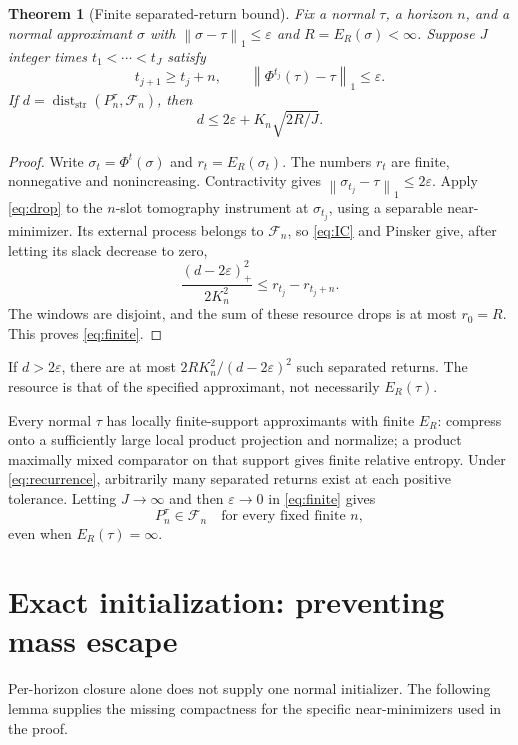 \documentclass[11pt,a4paper]{article}
\numberwithin{equation}{section}
\newtheorem{theorem}{Theorem}[section]
\theoremstyle{remark}
\newcommand{\ER}{E_R}
\newcommand{\dd}{\operatorname{dist}_{\mathrm{str}}}
\newcommand{\normone}[1]{\left\|#1\right\|_1}
\begin{document}
\begin{theorem}[Finite separated-return bound]\label{thm:finite}
Fix a normal \(\tau\), a horizon \(n\), and a normal approximant \(\sigma\)
with \(\normone{\sigma-\tau}\leq\varepsilon\) and
\(R=\ER(\sigma)<\infty\). Suppose \(J\) integer times
\(t_1<\cdots<t_J\) satisfy
\[
 t_{j+1}\geq t_j+n,\qquad
 \normone{\Phi^{t_j}(\tau)-\tau}\leq\varepsilon.
\]
If \(d=\dd(P_n^\tau,\mathcal F_n)\), then
\begin{equation}
 d\leq 2\varepsilon+K_n\sqrt{2R/J}.             \label{eq:finite}
\end{equation}
\end{theorem}
\begin{proof}
Write \(\sigma_t=\Phi^t(\sigma)\) and \(r_t=\ER(\sigma_t)\).
The numbers \(r_t\) are finite, nonnegative and nonincreasing.
Contractivity gives \(\normone{\sigma_{t_j}-\tau}\leq2\varepsilon\).
Apply \eqref{eq:drop} to the \(n\)-slot tomography instrument at
\(\sigma_{t_j}\), using a separable near-minimizer. Its external process
belongs to \(\mathcal F_n\), so \eqref{eq:IC} and Pinsker give, after
letting its slack decrease to zero,
\[
 \frac{(d-2\varepsilon)_+^2}{2K_n^2}
       \leq r_{t_j}-r_{t_j+n}.
\]
The windows are disjoint, and the sum of these resource drops is at most
\(r_0=R\). This proves \eqref{eq:finite}.
\end{proof}
If \(d>2\varepsilon\), there are at most
\(2RK_n^2/(d-2\varepsilon)^2\) such separated returns. The resource is
that of the specified approximant, not necessarily \(\ER(\tau)\).

Every normal \(\tau\) has locally finite-support approximants with finite
\(\ER\): compress onto a sufficiently large local product projection and
normalize; a product maximally mixed comparator on that support gives
finite relative entropy. Under \eqref{eq:recurrence}, arbitrarily many
separated returns exist at each positive tolerance. Letting \(J\to\infty\)
and then \(\varepsilon\to0\) in \eqref{eq:finite} gives
\[
 P_n^\tau\in\mathcal F_n\quad\text{for every fixed finite }n,
\]
even when \(\ER(\tau)=\infty\).

\section{Exact initialization: preventing mass escape}\label{sec:exact}
Per-horizon closure alone does not supply one normal initializer. The
following lemma supplies the missing compactness for the specific
near-minimizers used in the proof.
\end{document}
